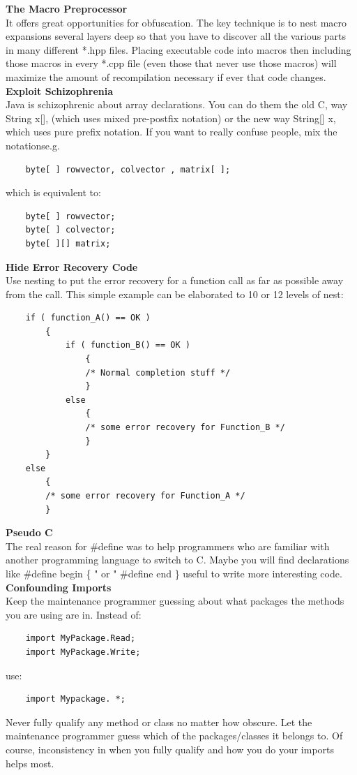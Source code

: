 \documentclass[11pt,twoside,a4paper]{article}
\begin{document}
\textbf{The Macro Preprocessor}~\\
It offers great opportunities for obfuscation. The key technique is to nest macro expansions several layers deep so that you have to discover all the various parts in many different *.hpp files. Placing executable code into macros then including those macros in every *.cpp file (even those that never use those macros) will maximize the amount of recompilation necessary if ever that code changes.~\\ 

\textbf{Exploit Schizophrenia}~\\
Java is schizophrenic about array declarations. You can do them the old C, way String x[], (which uses mixed pre-postfix notation) or the new way String[] x, which uses pure prefix notation. If you want to really confuse people, mix the notationse.g. 
\begin{verbatim}
	byte[ ] rowvector, colvector , matrix[ ];
\end{verbatim}
which is equivalent to: 
\begin{verbatim}
	byte[ ] rowvector; 
	byte[ ] colvector; 
	byte[ ][] matrix; 
\end{verbatim}

\clearpage

\textbf{Hide Error Recovery Code}~\\
Use nesting to put the error recovery for a function call as far as possible away from the call. This simple example can be elaborated to 10 or 12 levels of nest: 
\begin{verbatim}
	if ( function_A() == OK ) 
		{ 
			if ( function_B() == OK ) 
				{ 
				/* Normal completion stuff */ 
				} 
			else 
				{ 
				/* some error recovery for Function_B */ 
				} 
		} 
	else 
		{ 
		/* some error recovery for Function_A */ 
		} 
\end{verbatim}

\textbf{Pseudo C}~\\
The real reason for \#define was to help programmers who are familiar with another programming language to switch to C. Maybe you will find declarations like \#define begin \{ " or " \#define end \} useful to write more interesting code. ~\\

\textbf{Confounding Imports}~\\
Keep the maintenance programmer guessing about what packages the methods you are using are in. Instead of: 
\begin{verbatim}
	import MyPackage.Read; 
	import MyPackage.Write; 
\end{verbatim}
use:
\begin{verbatim}
	import Mypackage. *; 
\end{verbatim}
Never fully qualify any method or class no matter how obscure. Let the maintenance programmer guess which of the packages/classes it belongs to. Of course, inconsistency in when you fully qualify and how you do your imports helps most. ~\\
\end{document}
